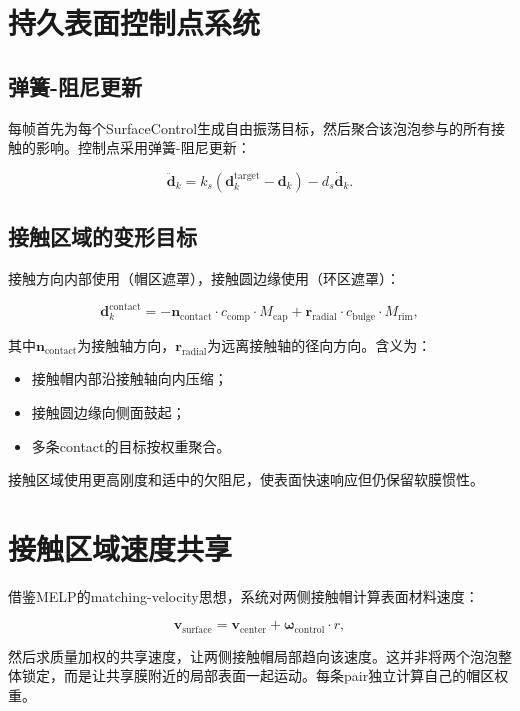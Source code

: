 \section{持久表面控制点系统}

\subsection{弹簧-阻尼更新}

每帧首先为每个SurfaceControl生成自由振荡目标，然后聚合该泡泡参与的所有接触的影响。控制点采用弹簧-阻尼更新：

\[
\ddot{\mathbf{d}}_k = k_s(\mathbf{d}_k^{\mathrm{target}} - \mathbf{d}_k) - d_s \dot{\mathbf{d}}_k.
\]

\subsection{接触区域的变形目标}

接触方向内部使用（帽区遮罩），接触圆边缘使用（环区遮罩）：

\[
\mathbf{d}_k^{\mathrm{contact}} =
-\mathbf{n}_{\mathrm{contact}} \cdot c_{\mathrm{comp}} \cdot M_{\mathrm{cap}}
+ \mathbf{r}_{\mathrm{radial}} \cdot c_{\mathrm{bulge}} \cdot M_{\mathrm{rim}},
\]

其中$\mathbf{n}_{\mathrm{contact}}$为接触轴方向，$\mathbf{r}_{\mathrm{radial}}$为远离接触轴的径向方向。含义为：
\begin{itemize}
  \item 接触帽内部沿接触轴向内压缩；
  \item 接触圆边缘向侧面鼓起；
  \item 多条contact的目标按权重聚合。
\end{itemize}

接触区域使用更高刚度和适中的欠阻尼，使表面快速响应但仍保留软膜惯性。

\section{接触区域速度共享}

借鉴MELP\cite{deng2022melp}的matching-velocity思想，系统对两侧接触帽计算表面材料速度：

\[
\mathbf{v}_{\mathrm{surface}} = \mathbf{v}_{\mathrm{center}} + \boldsymbol{\omega}_{\mathrm{control}} \cdot r,
\]

然后求质量加权的共享速度，让两侧接触帽局部趋向该速度。这并非将两个泡泡整体锁定，而是让共享膜附近的局部表面一起运动。每条pair独立计算自己的帽区权重。

